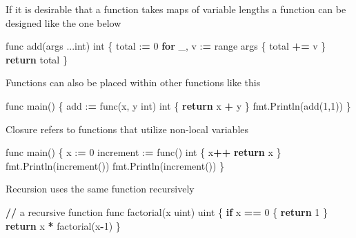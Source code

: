 \documentclass[]{book}
\newenvironment{Shaded}{\begin{snugshade}}{\end{snugshade}}
\newcommand{\DecValTok}[1]{\textcolor[rgb]{0.00,0.00,0.81}{#1}}
\newcommand{\ControlFlowTok}[1]{\textcolor[rgb]{0.13,0.29,0.53}{\textbf{#1}}}
\newcommand{\OperatorTok}[1]{\textcolor[rgb]{0.81,0.36,0.00}{\textbf{#1}}}
\newcommand{\BuiltInTok}[1]{#1}
\newcommand{\NormalTok}[1]{#1}
\begin{document}
If it is desirable that a function takes maps of variable lengths a
function can be designed like the one below

\begin{Shaded}
\begin{Highlighting}[]
\NormalTok{func add(args ...}\BuiltInTok{int}\NormalTok{) }\BuiltInTok{int}\NormalTok{ \{ }
\NormalTok{    total :}\OperatorTok{=} \DecValTok{0}              
    \ControlFlowTok{for}\NormalTok{ _, v :}\OperatorTok{=} \BuiltInTok{range}\NormalTok{ args \{}
\NormalTok{        total }\OperatorTok{+=}\NormalTok{ v          }
\NormalTok{    \}                       }
    \ControlFlowTok{return}\NormalTok{ total            }
\NormalTok{\}  }
\end{Highlighting}
\end{Shaded}

Functions can also be placed within other functions like this

\begin{Shaded}
\begin{Highlighting}[]
\NormalTok{func main() \{}
\NormalTok{  add :}\OperatorTok{=}\NormalTok{ func(x, y }\BuiltInTok{int}\NormalTok{) }\BuiltInTok{int}\NormalTok{ \{}
    \ControlFlowTok{return}\NormalTok{ x }\OperatorTok{+}\NormalTok{ y}
\NormalTok{  \}}
\NormalTok{  fmt.Println(add(}\DecValTok{1}\NormalTok{,}\DecValTok{1}\NormalTok{))}
\NormalTok{\}}
\end{Highlighting}
\end{Shaded}

Closure refers to functions that utilize non-local variables

\begin{Shaded}
\begin{Highlighting}[]
\NormalTok{func main() \{}
\NormalTok{  x :}\OperatorTok{=} \DecValTok{0}
\NormalTok{  increment :}\OperatorTok{=}\NormalTok{ func() }\BuiltInTok{int}\NormalTok{ \{}
\NormalTok{    x}\OperatorTok{++}
    \ControlFlowTok{return}\NormalTok{ x}
\NormalTok{  \}}
\NormalTok{  fmt.Println(increment())}
\NormalTok{  fmt.Println(increment())}
\NormalTok{\}}
\end{Highlighting}
\end{Shaded}

Recursion uses the same function recursively

\begin{Shaded}
\begin{Highlighting}[]
\OperatorTok{//}\NormalTok{ a recursive function      }
\NormalTok{func factorial(x uint) uint \{}
    \ControlFlowTok{if}\NormalTok{ x }\OperatorTok{==} \DecValTok{0}\NormalTok{ \{              }
        \ControlFlowTok{return} \DecValTok{1}             
\NormalTok{    \}                        }
    \ControlFlowTok{return}\NormalTok{ x }\OperatorTok{*}\NormalTok{ factorial(x}\OperatorTok{-}\DecValTok{1}\NormalTok{)}
\NormalTok{\}      }
\end{Highlighting}
\end{Shaded}
\end{document}
